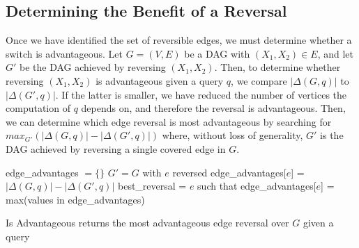 \subsection{Determining the Benefit of a Reversal}
\null \quad \quad Once we have identified the set of reversible edges, we must determine whether a switch is advantageous. Let $G=(V,E)$ be a DAG with $(X_{1},X_{2}) \in E$, and let $G'$ be the DAG achieved by reversing $(X_{1},X_{2})$. Then, to determine whether reversing $(X_{1},X_{2})$ is advantageous given a query $q$, we compare $|\Delta(G,q)|$ to $|\Delta(G',q)|$. If the latter is smaller, we have reduced the number of vertices the computation of $q$ depends on, and therefore the reversal is advantageous. \newline
\null \quad \quad Then, we can determine which edge reversal is most advantageous by searching for $max_{G'}(|\Delta(G,q)| - |\Delta(G',q)|)$ where, without loss of generality, $G'$ is the DAG achieved by reversing a single covered edge in $G$. 
\begin{algorithm}[h!]
\DontPrintSemicolon
{}
\begin{spacing}{1.25}

edge\_advantages $=\{\}$ \;
 {
	$G' = G$ with $e$ reversed 
	edge\_advantages[$e$] = $|\Delta(G,q)| - |\Delta(G',q)|$ \;
  }
best\_reversal = $e$ such that edge\_advantages[$e$] = max(values in edge\_advantages) \;
\;
\end{spacing}

\caption{{\sc Is Advantageous} returns the most advantageous edge reversal over $G$ given a query}
\label{algo:isadv}
\end{algorithm}

